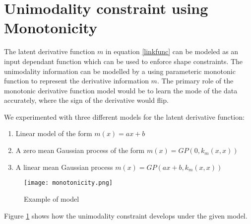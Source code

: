 \section{Unimodality constraint using Monotonicity}
The latent derivative function $m$ in equation \ref{linkfunc} can be modeled as an input dependant function which can be used to enforce shape constraints. The unimodality information can be modelled by a using parameteric monotonic function to represent the derivative information $m$. The primary role of the monotonic derivative function model would be to learn the mode of the data accurately, where the sign of the derivative would flip. 

We experimented with three different models for the latent derivative function:
\begin{enumerate}
	\item Linear model of the form $m(x)=ax+b$
	\item A zero mean Gaussian process of the form $m(x)=GP(0,k_m(x,x))$
	\item A linear mean Gaussian process $m(x)=GP(ax+b,k_m(x,x))$ 
\end{enumerate}

\begin{figure}[h]
  \texttt{[image: monotonicity.png]}
  \centering
  \caption{Example of model}
  \label{fig:unimodality_exp}
\end{figure}

Figure \ref{fig:unimodality_exp} shows how the unimodality constraint develops under the given model.



